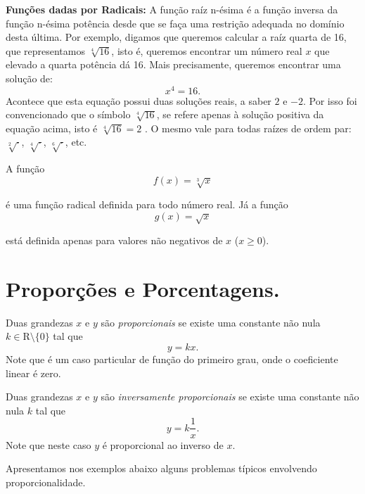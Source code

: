 \noindent\textbf{Funções dadas por Radicais:}  A função raíz n-ésima é a função inversa da função n-ésima potência desde que
se faça  uma restrição adequada no domínio desta última. Por exemplo, digamos que queremos calcular a raíz quarta de
16, que representamos $\sqrt[4]{16}$, isto é, queremos encontrar um número real $x$ que elevado a quarta potência
dá 16. Mais precisamente, queremos encontrar uma solução de:
$$x^4=16.$$
Acontece que esta equação possui duas soluções reais, a saber $2$ e $-2$. Por isso foi convencionado que o símbolo
$\sqrt[4]{16}$, se refere apenas à solução positiva da equação acima, isto é $\sqrt[4]{16}=2$ .
O mesmo vale para todas raízes de ordem par: $\sqrt[2]{\cdot }$, $\sqrt[4]{\cdot}$, $\sqrt[6]{\cdot}$, etc.
\begin{center}
\begin{minipage}{16cm}
\end{minipage}
\end{center}
\begin{exemplo} A função $$f(x)=\sqrt[3]{x}$$

é uma função radical definida para todo número real. Já a função $$g(x)= \sqrt{x}$$

está definida apenas para valores não negativos de $x$ ($x\geq 0$).
\end{exemplo}


\section{Proporções e Porcentagens.}

Duas grandezas $x$ e $y$ são \textit{proporcionais} se existe uma constante não nula $k\in \mbox{R}\setminus \{0\}$ tal que $$y=kx.$$ Note que é um caso particular de função do primeiro grau, onde o coeficiente linear é zero.

Duas grandezas $x$ e $y$ são \textit{inversamente proporcionais} se existe uma constante não nula $k$ tal que $$y=k\frac{1}{x}.$$ Note que neste caso $y$ é proporcional ao inverso de $x$.

Apresentamos nos exemplos abaixo alguns problemas típicos envolvendo proporcionalidade.


